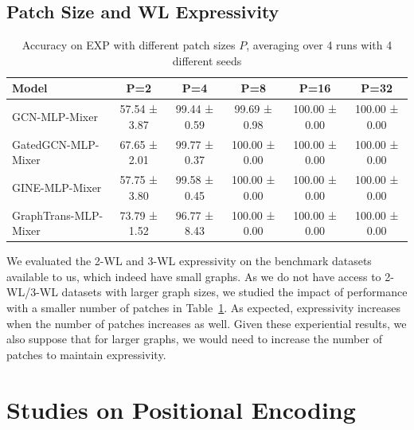 \documentclass{article}
\begin{document}
\subsection{Patch Size and WL Expressivity}

\begin{table}[!ht]
  \caption{Accuracy on EXP with different patch sizes $P$, averaging over 4 runs with 4 different seeds}
  \label{tab: exp}
    \centering
    \small
    \begin{tabular}{lccccc}
    \toprule
    Model & P=2 &P=4 & P=8 & P=16 & P=32 \\
    \midrule
     {GCN-MLP-Mixer}
     & 57.54 ± 3.87 
     & 99.44 ± 0.59 &99.69 ± 0.98 & 100.00 ± 0.00 & 100.00 ± 0.00  \\
     {GatedGCN-MLP-Mixer}
     & 67.65 ± 2.01 
     & 99.77 ± 0.37 & 100.00 ± 0.00 & 100.00 ± 0.00 & 100.00 ± 0.00  \\
     {GINE-MLP-Mixer}
     & 57.75 ± 3.80 
     & 99.58 ± 0.45 
     & 100.00 ± 0.00 & 100.00 ± 0.00 & 100.00 ± 0.00  \\
     {GraphTrans-MLP-Mixer}& 73.79 ± 1.52 & 96.77 ± 8.43 & 100.00 ± 0.00& 100.00 ± 0.00 & 100.00 ± 0.00  \\
     \bottomrule
    \end{tabular}
    \end{table}
    
We evaluated the 2-WL and 3-WL expressivity on the benchmark datasets available to us, which indeed have small graphs. As we do not have access to 2-WL/3-WL datasets with larger graph sizes, we studied the impact of performance with a smaller number of patches in Table~\ref{tab: exp}. As expected, expressivity increases when the number of patches increases as well. Given these experiential results, we also suppose that for larger graphs, we would need to increase the number of patches to maintain expressivity.


\section{Studies on Positional Encoding}\label{app sec: pe}
\end{document}

